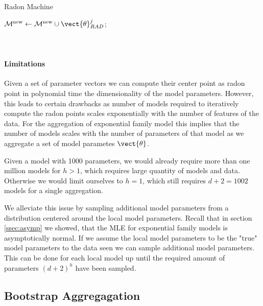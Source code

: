 \begin{algo}{Radon Machine}
\begin{algorithm}[H]
\begin{algorithmic}[1]
{{                $\mathcal{M}^{\text{new}}\leftarrow \mathcal{M}^{\text{new}} \cup \vect{\theta}_{RAD}^j$;  \\
            } 
            \ENDFOR
            }\\
            \\
            \ENDFOR
        \end{algorithmic}
    \end{algorithm}
\end{algo}

\paragraph*{Limitations}
Given a set of parameter vectors we can compute their center point as radon point in polynomial time \wrt the dimensionality of the model parameters.
However, this leads to certain drawbacks as number of models required to iteratively compute the radon points scales exponentially with the number of features of the data.
For the aggregation of exponential family model this implies that the number of models scales with the number of parameters of that model as we aggregate a set of model parametes $\vect{\theta}$.

Given a model with 1000 parameters, we would already require more than one million models for $h > 1$, which requires large quantity of models and data.
Otherwise we would limit ourselves to $h=1$, which still requires $d+2 = 1002$ models for a single aggregation.

We alleviate this issue by sampling additional model parameters from a distribution centered around the local model parameters. 
Recall that in section \ref{ssec:asymp} we showed, that the MLE for exponential family 
models is asymptotically normal.
If we assume the local model parameters to be the "true" model parameters \wrt to the data seen we can sample additional model parameters. 
This can be done for each local model up until the required amount of parameters $(d+2)^h$ have been sampled.


\subsection{Bootstrap Aggregagation}

